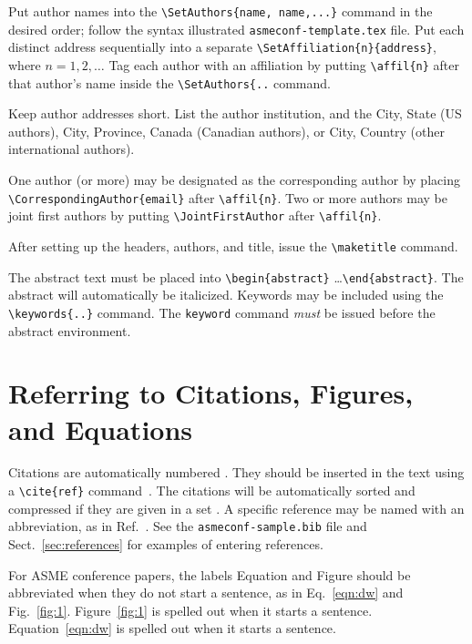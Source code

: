 \documentclass[captionpatch,colorlinks,upint,subscriptcorrection,varvw,german]{asmeconf}
\begin{document}
Put author names into the \verb|\SetAuthors{name, name,...}| command in the desired order; follow the syntax illustrated \texttt{asmeconf-template.tex} file. Put each distinct address sequentially into a separate \verb|\SetAffiliation{n}{address}|, where $n = 1,2,\ldots$ Tag each author with an affiliation by putting \verb|\affil{n}| after that author's name inside the \verb|\SetAuthors{..| command.

Keep author addresses short.  List the author institution, and the City, State (US authors), City, Province, Canada (Canadian authors), or City, Country (other international authors).

One author (or more) may be designated as the corresponding author by placing \verb|\CorrespondingAuthor{email}|  after \verb|\affil{n}|. Two or more authors may be joint first authors by putting \verb|\JointFirstAuthor| after \verb|\affil{n}|.

After setting up the headers, authors,  and title, issue the \verb|\maketitle| command.

The abstract text must be placed into \verb|\begin{abstract}| \ldots \verb|\end{abstract}|. The abstract will automatically be italicized. Keywords may be included using the \verb|\keywords{..}| command. The \texttt{keyword} command \textit{must} be issued before the abstract environment.


\section{Referring to Citations, Figures, and Equations}

Citations are automatically numbered \cite{ning2002}. They should be inserted in the text using a \verb|\cite{ref}| command~\cite{gibson2008,stevens1999}. The citations will be automatically sorted and compressed if they are given in a set \cite{stevens1999,ning2002,gibson2008,wions2005,smith2002,watson1982}.
A specific reference may be named with an abbreviation, as in Ref.~\cite{watson1982}.
See the \texttt{asmeconf-sample.bib} file and Sect.~\ref{sec:references} for examples of entering references.

For ASME conference papers, the labels Equation and Figure should be abbreviated when they do not start a sentence, as in  Eq.~\eqref{eqn:dw} and Fig.~\ref{fig:1}. Figure~\ref{fig:1} is spelled out when it starts a sentence. Equation~\eqref{eqn:dw} is spelled out when it starts a sentence.
\end{document}
